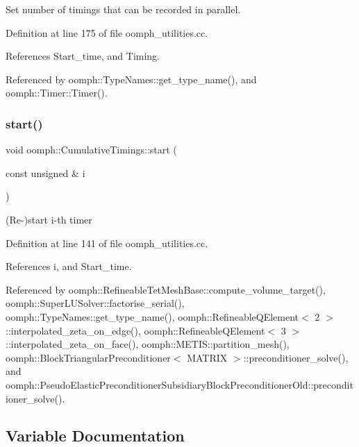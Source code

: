 Set number of timings that can be recorded in parallel. 



Definition at line 175 of file oomph\+\_\+utilities.\+cc.



References Start\+\_\+time, and Timing.



Referenced by oomph\+::\+Type\+Names\+::get\+\_\+type\+\_\+name(), and oomph\+::\+Timer\+::\+Timer().

\mbox{\label{namespaceoomph_1_1CumulativeTimings_aeafe5cb81741d54561e4b62572a1e3df}} 
\subsubsection{\texorpdfstring{start()}{start()}}
{\footnotesize\ttfamily void oomph\+::\+Cumulative\+Timings\+::start (\begin{DoxyParamCaption}\item[{const unsigned \&}]{i }\end{DoxyParamCaption})}



(Re-\/)start i-\/th timer 



Definition at line 141 of file oomph\+\_\+utilities.\+cc.



References i, and Start\+\_\+time.



Referenced by oomph\+::\+Refineable\+Tet\+Mesh\+Base\+::compute\+\_\+volume\+\_\+target(), oomph\+::\+Super\+L\+U\+Solver\+::factorise\+\_\+serial(), oomph\+::\+Type\+Names\+::get\+\_\+type\+\_\+name(), oomph\+::\+Refineable\+Q\+Element$<$ 2 $>$\+::interpolated\+\_\+zeta\+\_\+on\+\_\+edge(), oomph\+::\+Refineable\+Q\+Element$<$ 3 $>$\+::interpolated\+\_\+zeta\+\_\+on\+\_\+face(), oomph\+::\+M\+E\+T\+I\+S\+::partition\+\_\+mesh(), oomph\+::\+Block\+Triangular\+Preconditioner$<$ M\+A\+T\+R\+I\+X $>$\+::preconditioner\+\_\+solve(), and oomph\+::\+Pseudo\+Elastic\+Preconditioner\+Subsidiary\+Block\+Preconditioner\+Old\+::preconditioner\+\_\+solve().



\subsection{Variable Documentation}
\mbox{\label{namespaceoomph_1_1CumulativeTimings_ad9ef14aa764288369edd9265b61dc39c}} 
